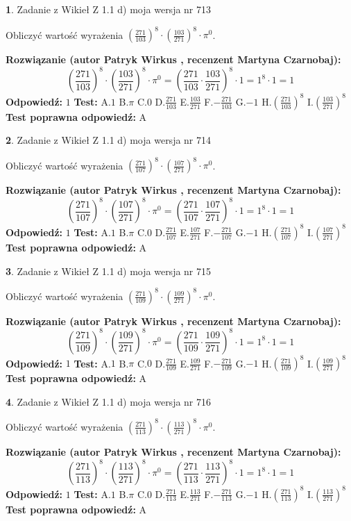 \documentclass[12pt, a4paper]{article}
\theoremstyle{definition} %
\newtheorem{zad}{}
\newcommand{\zadStart}[1]{\begin{zad}#1\newline}
\newcommand{\zadStop}{\end{zad}}
\newcommand{\rozwStart}[2]{\noindent \textbf{Rozwiązanie (autor #1 , recenzent #2): }\newline}
\newcommand{\rozwStop}{\newline}
\newcommand{\odpStart}{\noindent \textbf{Odpowiedź:}\newline}
\newcommand{\odpStop}{\newline}
\newcommand{\testStart}{\noindent \textbf{Test:}\newline}
\newcommand{\testStop}{\newline}
\newcommand{\kluczStart}{\noindent \textbf{Test poprawna odpowiedź:}\newline}
\newcommand{\kluczStop}{\newline}
\begin{document}
\zadStart{Zadanie z Wikieł Z 1.1 d) moja wersja nr 713}

Obliczyć wartość wyrażenia $(\frac{271}{103})^{8} \cdot (\frac{103}{271})^{8} \cdot \pi^{0}$.
\zadStop
\rozwStart{Patryk Wirkus}{Martyna Czarnobaj}
$$(\frac{271}{103})^{8} \cdot (\frac{103}{271})^{8} \cdot \pi^{0} = (\frac{271}{103} \cdot \frac{103}{271})^{8} \cdot 1 = 1^{8} \cdot 1 = 1$$
\rozwStop
\odpStart
$1$
\odpStop
\testStart
A.$1$ B.$\pi$ C.$0$ D.$\frac{271}{103}$ E.$\frac{103}{271}$
F.$-\frac{271}{103}$ G.$-1$
H.$(\frac{271}{103})^{8}$
I.$(\frac{103}{271})^{8}$
\testStop
\kluczStart
A
\kluczStop



\zadStart{Zadanie z Wikieł Z 1.1 d) moja wersja nr 714}

Obliczyć wartość wyrażenia $(\frac{271}{107})^{8} \cdot (\frac{107}{271})^{8} \cdot \pi^{0}$.
\zadStop
\rozwStart{Patryk Wirkus}{Martyna Czarnobaj}
$$(\frac{271}{107})^{8} \cdot (\frac{107}{271})^{8} \cdot \pi^{0} = (\frac{271}{107} \cdot \frac{107}{271})^{8} \cdot 1 = 1^{8} \cdot 1 = 1$$
\rozwStop
\odpStart
$1$
\odpStop
\testStart
A.$1$ B.$\pi$ C.$0$ D.$\frac{271}{107}$ E.$\frac{107}{271}$
F.$-\frac{271}{107}$ G.$-1$
H.$(\frac{271}{107})^{8}$
I.$(\frac{107}{271})^{8}$
\testStop
\kluczStart
A
\kluczStop



\zadStart{Zadanie z Wikieł Z 1.1 d) moja wersja nr 715}

Obliczyć wartość wyrażenia $(\frac{271}{109})^{8} \cdot (\frac{109}{271})^{8} \cdot \pi^{0}$.
\zadStop
\rozwStart{Patryk Wirkus}{Martyna Czarnobaj}
$$(\frac{271}{109})^{8} \cdot (\frac{109}{271})^{8} \cdot \pi^{0} = (\frac{271}{109} \cdot \frac{109}{271})^{8} \cdot 1 = 1^{8} \cdot 1 = 1$$
\rozwStop
\odpStart
$1$
\odpStop
\testStart
A.$1$ B.$\pi$ C.$0$ D.$\frac{271}{109}$ E.$\frac{109}{271}$
F.$-\frac{271}{109}$ G.$-1$
H.$(\frac{271}{109})^{8}$
I.$(\frac{109}{271})^{8}$
\testStop
\kluczStart
A
\kluczStop



\zadStart{Zadanie z Wikieł Z 1.1 d) moja wersja nr 716}

Obliczyć wartość wyrażenia $(\frac{271}{113})^{8} \cdot (\frac{113}{271})^{8} \cdot \pi^{0}$.
\zadStop
\rozwStart{Patryk Wirkus}{Martyna Czarnobaj}
$$(\frac{271}{113})^{8} \cdot (\frac{113}{271})^{8} \cdot \pi^{0} = (\frac{271}{113} \cdot \frac{113}{271})^{8} \cdot 1 = 1^{8} \cdot 1 = 1$$
\rozwStop
\odpStart
$1$
\odpStop
\testStart
A.$1$ B.$\pi$ C.$0$ D.$\frac{271}{113}$ E.$\frac{113}{271}$
F.$-\frac{271}{113}$ G.$-1$
H.$(\frac{271}{113})^{8}$
I.$(\frac{113}{271})^{8}$
\testStop
\kluczStart
A
\kluczStop
\end{document}
